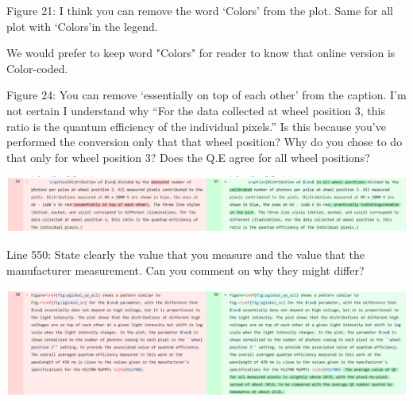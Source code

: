 \documentclass[11pt]{report}
\begin{document}
\begin{tcolorbox}[enlarge top by=2em,colbacktitle=black!60!white,colframe=black!80!white,left=0pt,right=0pt,top=0pt,bottom=0pt,boxrule=0.3pt,title=\bfseries1.10]
Figure 21:  I think you can remove the word ‘Colors’ from the plot.  Same for all plot with ‘Colors’in the legend.
\end{tcolorbox}

We would prefer to keep word "Colors" for reader to know that online version is Color-coded.


\begin{tcolorbox}[enlarge top by=2em,colbacktitle=black!60!white,colframe=black!80!white,left=0pt,right=0pt,top=0pt,bottom=0pt,boxrule=0.3pt,title=\bfseries1.11]
Figure 24:  You can remove ‘essentially on top of each other’ from the caption.  I’m not certain I understand why “For the data collected at wheel position 3,  this ratio is the quantum efficiency of the individual pixels.” Is this because you’ve performed the conversion only that that wheel position? Why do you chose to do that only for wheel position 3?  Does the Q.E agree for all wheel positions?
\end{tcolorbox}


\includegraphics[width=\linewidth]{round1/1.11.png}

\begin{tcolorbox}[enlarge top by=2em,colbacktitle=black!60!white,colframe=black!80!white,left=0pt,right=0pt,top=0pt,bottom=0pt,boxrule=0.3pt,title=\bfseries1.12]
Line 550:  State clearly the value that you measure and the value that the manufacturer measurement.  Can you comment on why they might differ?
\end{tcolorbox}


\includegraphics[width=\linewidth]{round1/1.12.png}
\end{document}
